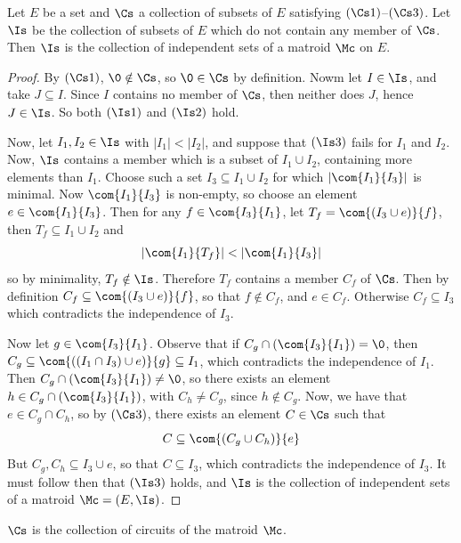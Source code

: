 \begin{theorem}\label{theorem_1.1.4}
  Let $E$ be a set and $\Cs$ a collection of subsets of $E$ satisfying
   $(\Cs1)$--$(\Cs3)$. Let $\Is$ be the collection of subsets of $E$
   which do not contain any member of $\Cs$. Then $\Is$ is the
   collection of independent sets of a matroid $\Mc$ on $E$.
\end{theorem}
\begin{proof}
  By $(\Cs1)$, $\0 \notin \Cs$, so $\0 \in \Cs$ by definition. Nowm
  let $I \in \Is$, and take $J \subseteq I$. Since $I$ contains no
  member of $\Cs$, then neither does $J$, hence  $J \in \Is$. So both
  $(\Is1)$ and $(\Is2)$ hold.

  Now, let $I_1, I_2 \in \Is$ with $|I_1|<|I_2|$, and suppose that
  $(\Is3)$ fails for $I_1$ and $I_2$. Now, $\Is$ contains a member
  which is a subset of $I_1 \cup I_2$, containing more elements than
  $I_1$. Choose such a set $I_3 \subseteq I_1 \cup I_2$ for which
  $|\com{I_1}{I_3}|$ is minimal. Now $\com{I_1}{I_3}$ is non-empty, so
  choose an element $e \in \com{I_1}{I_3}$. Then for any $f \in
  \com{I_3}{I_1}$, let $T_f=\com{(I_3 \cup e)}{f}$, then $T_f
  \subseteq I_1 \cup I_2$ and
  \begin{equation*}
    |\com{I_1}{T_f}|<|\com{I_1}{I_3}|
  \end{equation*}
  so by minimality, $T_f \notin \Is$. Therefore $T_f$ contains a
  member $C_f$ of $\Cs$. Then by definition $C_f \subseteq \com{(I_3
  \cup e)}{f}$, so that $f \notin C_f$, and $e \in C_f$. Otherwise
  $C_f \subseteq I_3$ which contradicts the independence of $I_3$.

  Now let $g \in \com{I_3}{I_1}$. Observe that if $C_g \cap
  (\com{I_3}{I_1})=\0$, then $C_g \subseteq \com{((I_1 \cap I_3) \cup
  e)}{g} \subseteq I_1$, which contradicts the independence of $I_1$.
  Then $C_g \cap (\com{I_3}{I_1}) \neq \0$, so there exists an
  element $h \in C_g \cap (\com{I_3}{I_1})$, with $C_h \neq C_g$,
  since $h \notin C_g$. Now, we have that $e \in C_g \cap C_h$, so by
  $(\Cs3)$, there exists an element $C \in \Cs$ such that
  \begin{equation*}
    C \subseteq \com{(C_g \cup C_h)}{e}
  \end{equation*}
  But $C_g,C_h \subseteq I_3 \cup e$, so that $C \subseteq I_3$, which
  contradicts the independence of $I_3$. It must follow then that
  $(\Is3)$ holds, and $\Is$ is the collection of independent sets of a
  matroid $\Mc=(E,\Is)$.
\end{proof}
\begin{corollary}
  $\Cs$ is the collection of circuits of the matroid $\Mc$.
\end{corollary}
